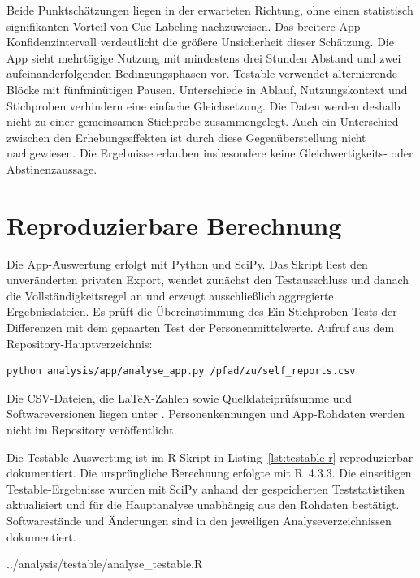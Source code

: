 Beide Punktschätzungen liegen in der erwarteten Richtung, ohne einen statistisch signifikanten Vorteil von Cue-Labeling nachzuweisen. Das breitere App-Konfidenzintervall verdeutlicht die größere Unsicherheit dieser Schätzung. Die App sieht mehrtägige Nutzung mit mindestens drei Stunden Abstand und zwei aufeinanderfolgenden Bedingungsphasen vor. Testable verwendet alternierende Blöcke mit fünfminütigen Pausen. Unterschiede in Ablauf, Nutzungskontext und Stichproben verhindern eine einfache Gleichsetzung. Die Daten werden deshalb nicht zu einer gemeinsamen Stichprobe zusammengelegt. Auch ein Unterschied zwischen den Erhebungseffekten ist durch diese Gegenüberstellung nicht nachgewiesen. Die Ergebnisse erlauben insbesondere keine Gleichwertigkeits- oder Abstinenzaussage.

\section{Reproduzierbare Berechnung}
\label{sec:testable-r-code}
Die App-Auswertung erfolgt mit Python und SciPy. Das Skript  liest den unveränderten privaten Export, wendet zunächst den Testausschluss und danach die Vollständigkeitsregel an und erzeugt ausschließlich aggregierte Ergebnisdateien. Es prüft die Übereinstimmung des Ein-Stichproben-Tests der Differenzen mit dem gepaarten Test der Personenmittelwerte. Aufruf aus dem Repository-Hauptverzeichnis:
\begin{lstlisting}[basicstyle=\ttfamily\small,breaklines=true]
python analysis/app/analyse_app.py /pfad/zu/self_reports.csv
\end{lstlisting}
Die CSV-Dateien, die LaTeX-Zahlen sowie Quelldateiprüfsumme und Softwareversionen liegen unter . Personenkennungen und App-Rohdaten werden nicht im Repository veröffentlicht.

Die Testable-Auswertung ist im R-Skript in Listing~\ref{lst:testable-r} reproduzierbar dokumentiert. Die ursprüngliche Berechnung erfolgte mit R~4.3.3. Die einseitigen Testable-Ergebnisse wurden mit SciPy anhand der gespeicherten Teststatistiken aktualisiert und für die Hauptanalyse unabhängig aus den Rohdaten bestätigt. Softwarestände und Änderungen sind in den jeweiligen Analyseverzeichnissen dokumentiert.


 {../analysis/testable/analyse_testable.R}
